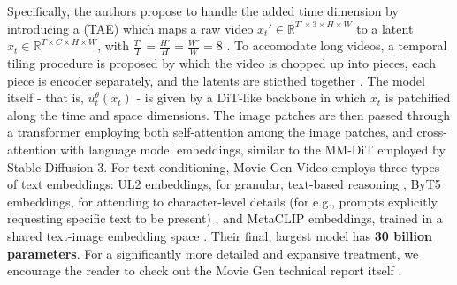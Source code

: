 Specifically, the authors propose to handle the added time dimension by introducing a  (TAE) which maps a raw video $x_t' \in \mathbb{R}^{T' \times 3 \times H \times W}$ to a latent $x_t\in\mathbb{R}^{T \times C \times H \times W}$, with $\tfrac{T'}{T} = \tfrac{H'}{H} = \tfrac{W'}{W} = 8$ \cite{moviegen}. To accomodate long videos, a temporal tiling procedure is proposed by which the video is chopped up into pieces, each piece is encoder separately, and the latents are sticthed together \cite{moviegen}. The model itself - that is, $u_t^\theta(x_t)$ - is given by a DiT-like backbone in which $x_t$ is patchified along the time and space dimensions. The image patches are then passed through a transformer employing both self-attention among the image patches, and cross-attention with language model embeddings, similar to the MM-DiT employed by Stable Diffusion 3. For text conditioning, Movie Gen Video employs three types of text embeddings: UL2 embeddings, for granular, text-based reasoning \cite{ul2}, ByT5 embeddings, for attending to character-level details (for e.g., prompts explicitly requesting specific text to be present) \cite{byte5}, and MetaCLIP embeddings, trained in a shared text-image embedding space \cite{metaclip, moviegen}. Their final, largest model has \textbf{30 billion parameters}. For a significantly more detailed and expansive treatment, we encourage the reader to check out the Movie Gen technical report itself \citep{moviegen}.


